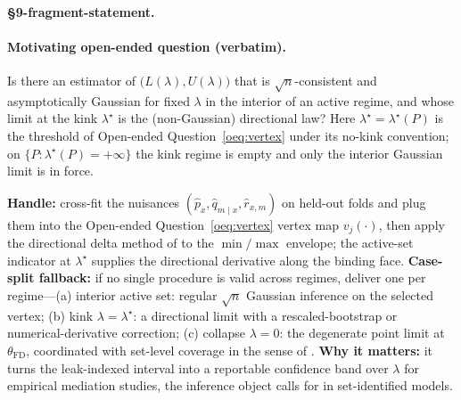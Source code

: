 
\paragraph{\S9-fragment-statement.}
\paragraph{Motivating open-ended question (verbatim).}
Is there an estimator of $\bigl(L(\lambda),U(\lambda)\bigr)$ that is $\sqrt n$-consistent and asymptotically
Gaussian for fixed $\lambda$ in the interior of an active regime, and whose limit at the kink $\lambda^\star$
is the (non-Gaussian) directional law? Here $\lambda^\star=\lambda^\star(P)$ is the threshold of Open-ended
Question~\ref{oeq:vertex} under its no-kink convention; on $\{P:\lambda^\star(P)=+\infty\}$ the kink regime is
empty and only the interior Gaussian limit is in force.

\smallskip\noindent\textbf{Handle:} cross-fit the nuisances $(\hat p_x,\hat q_{m\mid x},\hat r_{x,m})$ on
held-out folds and plug them into the Open-ended Question~\ref{oeq:vertex} vertex map
$v_j(\cdot)$, then apply the directional delta method of \citet{FangSantos2019DirectionallyDifferentiable} to
the $\min/\max$ envelope; the active-set indicator at $\lambda^\star$ supplies the directional derivative
along the binding face.
\textbf{Case-split fallback:} if no single procedure is valid across regimes, deliver one per regime---(a)
interior active set: regular $\sqrt n$ Gaussian inference on the selected vertex; (b) kink
$\lambda=\lambda^\star$: a directional limit with a rescaled-bootstrap or numerical-derivative correction; (c)
collapse $\lambda=0$: the degenerate point limit at $\theta_{\mathrm{FD}}$, coordinated with set-level
coverage in the sense of \citet{ChernozhukovHongTamer2007ParameterSets}.
\textbf{Why it matters:} it turns the leak-indexed interval into a reportable confidence band over
$\lambda$ for empirical mediation studies, the inference object \citet{ChernozhukovHongTamer2007ParameterSets}
calls for in set-identified models.

